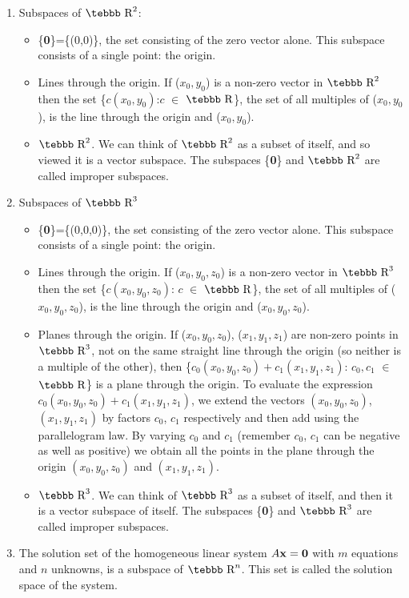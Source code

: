 \begin{enumerate}
\item Subspaces of $\mbox{\tebbb R}^2$:
\begin{itemize}
\item \{{\bf 0}\}=\{(0,0)\}, the set consisting of the zero vector alone.
This subspace consists of a single point: the origin.
\item Lines through the origin.  If ($x_0,y_0$) is a non-zero
vector in $\mbox{\tebbb R}^2$ then the set \{$c(x_0,y_0)$:$c$ $\in$ $\mbox{\tebbb R}$\},
the set of all multiples of ($x_0,y_0$), is the line through the origin and ($x_0,y_0$).
\item $\mbox{\tebbb R}^2$.  We can think of  $\mbox{\tebbb R}^2$ as a subset of itself,
and so viewed it is a vector subspace.  The subspaces \{{\bf 0}\} and $\mbox{\tebbb R}^2$
are called improper subspaces.\\
\end{itemize}
\item Subspaces of $\mbox{\tebbb R}^3$
\begin{itemize}
\item \{{\bf 0}\}=\{(0,0,0)\}, the set consisting of the zero vector alone.
This subspace consists of a single point: the origin.
\item Lines through the origin.  If ($x_0,y_0,z_0$) is a non-zero
vector in $\mbox{\tebbb R}^3$ then the set \{$c(x_0,y_0,z_0)$: $c$ $\in$ $\mbox{\tebbb R}$\},
the set of all multiples of ($x_0,y_0,z_0$), is the line through the origin and ($x_0,y_0,z_0$).
\item Planes through the origin.  If ($x_0,y_0,z_0$), ($x_1,y_1,z_1$) are non-zero points in
$\mbox{\tebbb R}^3$, not on the same straight line through the origin
(so neither is a multiple of the other),
then \{$c_0(x_0,y_0,z_0)+c_1(x_1,y_1,z_1)$: $c_0, c_1$ $\in$ $\mbox{\tebbb R}$\} is a plane
through the origin.  To evaluate the expression $c_0(x_0,y_0,z_0)+c_1(x_1,y_1,z_1)$, we extend
the vectors $(x_0,y_0,z_0)$, $(x_1,y_1,z_1)$ by factors $c_0$, $c_1$ respectively and then add
using the parallelogram law.  By varying $c_0$ and $c_1$ (remember $c_0$, $c_1$ can be negative
as well as positive) we obtain all the points in the plane through the origin $(x_0,y_0,z_0)$ and $(x_1,y_1,z_1)$.
\item $\mbox{\tebbb R}^3$.  We can think of $\mbox{\tebbb R}^3$ as a subset
of itself, and then it is a vector subspace of itself.  The subspaces \{{\bf 0}\} and $\mbox{\tebbb R}^3$ are called improper subspaces.
\end{itemize}
\item The solution set of the homogeneous linear system $A{\bf
x}={\bf 0}$ with $m$ equations and $n$ unknowns, is a subspace of
$\mbox{\tebbb R}^n$.  This set is called the solution space of the
system.
\end{enumerate}

